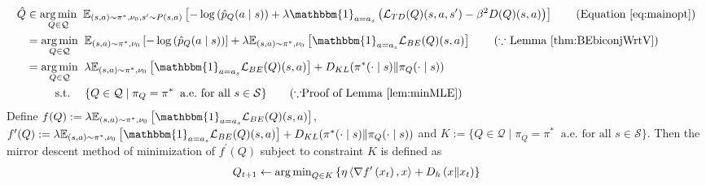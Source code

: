 \begin{align}
    \hat{Q} &\in  \underset{Q\in \mathcal{Q}}{\arg\min } \; \;\mathbb{E}_{(s, a)\sim \pi^*, \nu_0,  s^\prime \sim P(s, a)}  \left[-\log\left(\hat{p}_{Q}(a
\mid s)\right) + \lambda \mathbbm{1}_{a = a_s}\left( \mathcal{L}_{TD}(Q)(s,a,s^\prime)-\beta^2D(Q)(s,a)\right)\right]\tag{Equation \ref{eq:mainopt}}
\\
&= \underset{Q\in \mathcal{Q}}{\arg\min } \; \;\mathbb{E}_{(s, a)\sim \pi^*, \nu_0}  \left[-\log\left(\hat{p}_{Q}(a
\mid s)\right)\right] + \lambda\mathbb{E}_{(s, a)\sim \pi^*, \nu_0}\left[ \mathbbm{1}_{a = a_s} \mathcal{L}_{BE}(Q)(s,a)\right] \tag{$\because$ Lemma \ref{thm:BEbiconjWrtV}}
\\
&= \underset{Q\in \mathcal{Q}}{\arg\min } \; \; \lambda\mathbb{E}_{(s, a)\sim \pi^*, \nu_0}\left[ \mathbbm{1}_{a = a_s} \mathcal{L}_{BE}(Q)(s,a)\right] + D_{KL}(\pi^*(\cdot\mid s) \| \pi_{Q}(\cdot\mid s)) \notag
\\
&\quad\;\; \quad \text{s.t.} \quad \;\{Q\in\mathcal{Q}\mid \pi_Q = \pi^* \; \; \text{a.e.} \text{ for all }s\in\mathcal{S}\}\tag{$\because$Proof of Lemma \ref{lem:minMLE}}
\end{align}
Define $f(Q) := \lambda\mathbb{E}_{(s, a)\sim \pi^*, \nu_0}\left[ \mathbbm{1}_{a = a_s} \mathcal{L}_{BE}(Q)(s,a)\right]$, $f^\prime(Q) := \lambda\mathbb{E}_{(s, a)\sim \pi^*, \nu_0}\left[ \mathbbm{1}_{a = a_s} \mathcal{L}_{BE}(Q)(s,a)\right] + D_{KL}(\pi^*(\cdot\mid s) \| \pi_{Q}(\cdot\mid s))$ and $K:=\{Q\in\mathcal{Q}\mid \pi_Q = \pi^* \; \; \text{a.e.} \text{ for all }s\in\mathcal{S}\}$. Then the mirror descent method of minimization of $f^\prime(Q)$ subject to constraint $K$ is defined as 
\begin{align}
    Q_{t+1} \leftarrow \operatorname{\operatorname*{arg\,min}}_{Q\in K}\left\{\eta\left\langle\nabla f^\prime\left(x_t\right), x\right\rangle+D_h\left(x \| x_t\right)\right\}
\end{align}

